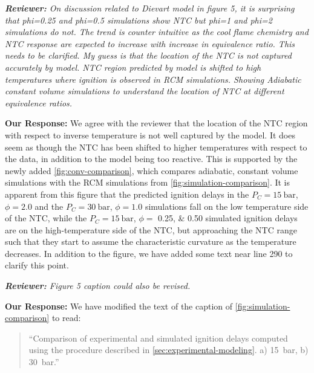 \documentclass{article}
\newenvironment{reviewer}{\vspace{0.5\baselineskip}\begingroup\itshape\textbf{Reviewer:}}{\endgroup\vspace{0.5\baselineskip}}
\newenvironment{response}{\vspace{0.5\baselineskip}\textbf{Our Response:}}{\vspace{0.5\baselineskip}}
\begin{document}
\begin{reviewer}
    On discussion related to Dievart model in figure 5, it is surprising that phi=0.25 and phi=0.5
    simulations show NTC but phi=1 and phi=2 simulations do not. The trend is counter intuitive as
    the cool flame chemistry and NTC response are expected to increase with increase in equivalence
    ratio. This needs to be clarified. My guess is that the location of the NTC is not captured
    accurately by model. NTC region predicted by model is shifted to high temperatures where
    ignition is observed in RCM simulations. Showing Adiabatic constant volume simulations to
    understand the location of NTC at different equivalence ratios.
\end{reviewer}

\begin{response}
    We agree with the reviewer that the location of the NTC region with respect to inverse
    temperature is not well captured by the model. It does seem as though the NTC has been shifted
    to higher temperatures with respect to the data, in addition to the model being too reactive.
    This is supported by the newly added \cref{fig:conv-comparison}, which compares adiabatic,
    constant volume simulations with the RCM simulations from \cref{fig:simulation-comparison}. It
    is apparent from this figure that the predicted ignition delays in the $P_C = \SI{15}{\bar}$,
    $\phi = \num{2.0}$ and the $P_C = \SI{30}{\bar}$, $\phi = \num{1.0}$ simulations fall on the low
    temperature side of the NTC, while the $P_C = \SI{15}{\bar}$, $\phi =$ \numlist{0.25;0.50}
    simulated ignition delays are on the high-temperature side of the NTC, but approaching the NTC
    range such that they start to assume the characteristic curvature as the temperature decreases.
    In addition to the figure, we have added some text near line 290 to clarify this point.
\end{response}

\begin{reviewer}
    Figure 5 caption could also be revised.
\end{reviewer}

\begin{response}
    We have modified the text of the caption of \cref{fig:simulation-comparison} to read:

    \begin{quote}
        ``Comparison of experimental and simulated ignition delays computed using the procedure
        described in \cref{sec:experimental-modeling}. a) \SI{15}{\bar}, b) \SI{30}{\bar}.''
    \end{quote}
\end{response}
\end{document}
